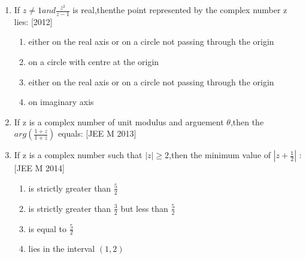 \documentclass[journal,12pt,twocolumn,article]{IEEEtran}
\theoremstyle{remark}
\begin{document}
\begin{enumerate}[start = 14]
\item If $z \neq 1 and \frac{z^2}{z-1}$ is real,thenthe point represented by the complex number z lies:
\hfill{[2012]}

\begin{enumerate}

\item either on the real axis or on a circle not passing through the origin
                                   
                              
\item on a circle with centre at the origin
                             
\item either on the real axis or on a circle not passing through the origin                                                                  
\item on imaginary axis
                                   
\end{enumerate}

\item If z is a complex number of unit modulus and arguement $\theta$,then the $arg\left(\frac{1+z}{1+\overline{z}}\right)$ equals:
\hfill{[JEE M 2013]}

\begin{enumerate}
\end{enumerate}

\item If z is a complex number such that $|z|\geq 2$,then the minimum value of $|z+\frac{1}{2}|$ :     
\hfill{[JEE M 2014]}  

\begin{enumerate}
                             
\item is strictly greater than $\frac{5}{2}$       

\item is strictly greater than $\frac{3}{2}$ but less than $\frac{5}{2}$
\item is equal to $\frac{5}{2}$

\item lies in the interval $(1,2)$


\end{enumerate}
\end{enumerate}
\end{document}
